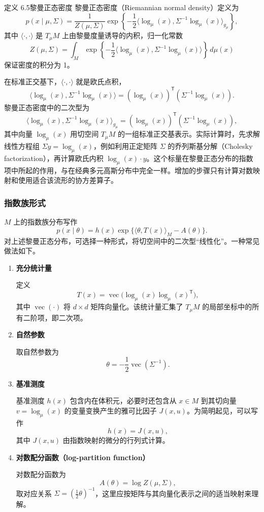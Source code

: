 \begin{statement}{定义 6.5}{黎曼正态密度}
黎曼正态密度（Riemannian normal density）定义为
\[
  p(x\mid\mu,\Sigma)=\frac{1}{Z(\mu,\Sigma)}
   \exp\left\{-\frac12\langle\log_\mu(x),\Sigma^{-1}\log_\mu(x)\rangle_{g_\mu}\right\},
\]
其中 $\langle\cdot,\cdot\rangle$ 是 $T_\mu M$ 上由黎曼度量诱导的内积，归一化常数
\[
  Z(\mu,\Sigma)=\int_M
   \exp\left\{-\frac12\langle\log_\mu(x),\Sigma^{-1}\log_\mu(x)\rangle\right\}\,d\mu(x)
\]
保证密度的积分为 1。

在标准正交基下，$\langle\cdot,\cdot\rangle$ 就是欧氏点积，
\[
  \langle\log_\mu(x),\Sigma^{-1}\log_\mu(x)\rangle
  =(\log_\mu(x))^{\mathsf T}(\Sigma^{-1}\log_\mu(x)).
\]
黎曼正态密度中的二次型为
\[
  \langle\log_\mu(x),\Sigma^{-1}\log_\mu(x)\rangle_{g_\mu}
  =(\log_\mu(x))^{\mathsf T}(\Sigma^{-1}\log_\mu(x)),
\]
其中向量 $\log_\mu(x)$ 用切空间 $T_\mu M$ 的一组标准正交基表示。实际计算时，先求解线性方程组 $\Sigma y=\log_\mu(x)$，例如利用正定矩阵 $\Sigma$ 的乔列斯基分解（Cholesky factorization），再计算欧氏内积 $\log_\mu(x)\cdot y$。这个标量在黎曼正态分布的指数项中所起的作用，与在经典多元高斯分布中完全一样。增加的步骤只有计算对数映射和使用适合该流形的协方差算子。
\end{statement}

\subsubsection{指数族形式}

$M$ 上的指数族分布写作
\[
  p(x\mid\theta)=h(x)\exp\{\langle\theta,T(x)\rangle_M-A(\theta)\}.
\]
对上述黎曼正态分布，可选择一种形式，将切空间中的二次型“线性化”。一种常见做法如下。
\begin{enumerate}
  \item \textbf{充分统计量}\par
  定义
  \[
    T(x)=\operatorname{vec}\bigl(\log_\mu(x)\log_\mu(x)^{\mathsf T}\bigr),
  \]
  其中 $\operatorname{vec}(\cdot)$ 将 $d\times d$ 矩阵向量化。该统计量汇集了 $T_\mu M$ 的局部坐标中的所有二阶项，即二次项。

  \item \textbf{自然参数}\par
  取自然参数为
  \[
    \theta=-\frac12\operatorname{vec}(\Sigma^{-1}).
  \]

  \item \textbf{基准测度}\par
  基准测度 $h(x)$ 包含内在体积元，必要时还包含从 $x\in M$ 到其切向量 $v=\log_\mu(x)$ 的变量变换产生的雅可比因子 $J(x,u)$。为简明起见，可以写作
  \[
    h(x)=J(x,u),
  \]
  其中 $J(x,u)$ 由指数映射的微分的行列式计算。

  \item \textbf{对数配分函数（log-partition function）}\par
  对数配分函数为
  \[
    A(\theta)=\log Z(\mu,\Sigma),
  \]
  取对应关系 $\Sigma=(\frac12\theta)^{-1}$，这里应按矩阵与其向量化表示之间的适当映射来理解。
\end{enumerate}

